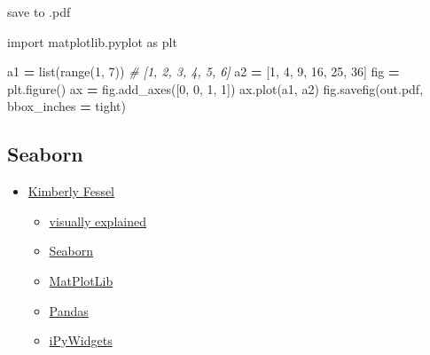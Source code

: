 \documentclass[
]{book}
\newenvironment{Shaded}{\begin{snugshade}}{\end{snugshade}}
\newcommand{\BuiltInTok}[1]{#1}
\newcommand{\CommentTok}[1]{\textcolor[rgb]{0.56,0.35,0.01}{\textit{#1}}}
\newcommand{\DecValTok}[1]{\textcolor[rgb]{0.00,0.00,0.81}{#1}}
\newcommand{\ImportTok}[1]{#1}
\newcommand{\NormalTok}[1]{#1}
\newcommand{\OperatorTok}[1]{\textcolor[rgb]{0.81,0.36,0.00}{\textbf{#1}}}
\newcommand{\StringTok}[1]{\textcolor[rgb]{0.31,0.60,0.02}{#1}}
\providecommand{\tightlist}{%
  \setlength{\itemsep}{0pt}\setlength{\parskip}{0pt}}
\theoremstyle{definition}
\theoremstyle{definition}
\theoremstyle{definition}
\theoremstyle{definition}
\theoremstyle{remark}
\begin{document}
save to .pdf

\begin{Shaded}
\begin{Highlighting}[]
\ImportTok{import}\NormalTok{ matplotlib.pyplot }\ImportTok{as}\NormalTok{ plt}

\NormalTok{a1 }\OperatorTok{=} \BuiltInTok{list}\NormalTok{(}\BuiltInTok{range}\NormalTok{(}\DecValTok{1}\NormalTok{, }\DecValTok{7}\NormalTok{)) }\CommentTok{\# [1, 2, 3, 4, 5, 6]}
\NormalTok{a2 }\OperatorTok{=}\NormalTok{ [}\DecValTok{1}\NormalTok{, }\DecValTok{4}\NormalTok{, }\DecValTok{9}\NormalTok{, }\DecValTok{16}\NormalTok{, }\DecValTok{25}\NormalTok{, }\DecValTok{36}\NormalTok{]}
\NormalTok{fig }\OperatorTok{=}\NormalTok{ plt.figure()}
\NormalTok{ax }\OperatorTok{=}\NormalTok{ fig.add\_axes([}\DecValTok{0}\NormalTok{, }\DecValTok{0}\NormalTok{, }\DecValTok{1}\NormalTok{, }\DecValTok{1}\NormalTok{])}
\NormalTok{ax.plot(a1, a2)}
\NormalTok{fig.savefig(}\StringTok{\textquotesingle{}out.pdf\textquotesingle{}}\NormalTok{, bbox\_inches }\OperatorTok{=} \StringTok{\textquotesingle{}tight\textquotesingle{}}\NormalTok{)}
\end{Highlighting}
\end{Shaded}

\hypertarget{seaborn}{%
\subsection{Seaborn}\label{seaborn}}

\begin{itemize}
\tightlist
\item
  \href{https://www.youtube.com/@KimberlyFessel/playlists}{Kimberly Fessel}

  \begin{itemize}
  \tightlist
  \item
    \href{https://www.youtube.com/playlist?list=PLtPIclEQf-3cYc7tP_mxrvNtp82NWVf8p}{visually explained}
  \item
    \href{https://www.youtube.com/playlist?list=PLtPIclEQf-3cG31dxSMZ8KTcDG7zYng1j}{Seaborn}
  \item
    \href{https://www.youtube.com/playlist?list=PLtPIclEQf-3dJmAj3IsSRwRoLbX-n3J81}{MatPlotLib}
  \item
    \href{https://www.youtube.com/playlist?list=PLtPIclEQf-3c-pUgSttUGV-3Y2D9g_0sW}{Pandas}
  \item
    \href{https://www.youtube.com/playlist?list=PLtPIclEQf-3fhfoFQU2MJYnQ6CyjQLQEa}{iPyWidgets}
  \end{itemize}
\end{itemize}
\end{document}

